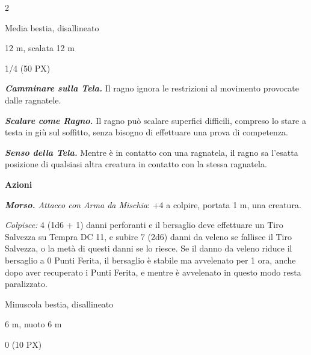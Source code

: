 \begin{multicols}{2}
{
\begin{description}[noitemsep, topsep=0pt, parsep=0pt, partopsep=0pt, itemsep=1pt, leftmargin=2.35cm,  labelwidth=2.2cm, itemindent=0cm, listparindent=0pt] %
\setlength{\baselineskip}{10pt}
\item[\textbf{Taglia/Tipo}] Media bestia, disallineato
\item[\textbf{Caratt.}] 
\item[\textbf{Punti Ferita}] 
\item[\textbf{Tiri Salvez.}] 
\item[\textbf{Movimento}] 12 m, scalata 12 m
\item[\textbf{Sfida}] 1/4 (50 PX)
\end{description}
\smallskip

\emph{\textbf{Camminare sulla Tela.}} Il ragno ignora le restrizioni al movimento provocate dalle ragnatele.

\emph{\textbf{Scalare come Ragno.}} Il ragno può scalare superfici difficili, compreso lo stare a testa in giù sul soffitto, senza bisogno di effettuare una prova di competenza.

\emph{\textbf{Senso della Tela.}} Mentre è in contatto con una ragnatela, il ragno sa l'esatta posizione di qualsiasi altra creatura in contatto con la stessa ragnatela.

\textbf{Azioni}

\emph{\textbf{Morso.} Attacco con Arma da Mischia}: +4 a colpire, portata 1 m, una creatura.

\emph{Colpisce:} 4 (1d6 + 1) danni perforanti e il bersaglio deve effettuare un Tiro Salvezza su Tempra DC 11, e subire 7 (2d6) danni da veleno se fallisce il Tiro Salvezza, o la metà di questi danni se lo riesce. Se il danno da veleno riduce il bersaglio a 0 Punti Ferita, il bersaglio è stabile ma avvelenato per 1 ora, anche dopo aver recuperato i Punti Ferita, e mentre è avvelenato in questo modo resta paralizzato.

\begin{description}[noitemsep, topsep=0pt, parsep=0pt, partopsep=0pt, itemsep=1pt, leftmargin=2.35cm,  labelwidth=2.2cm, itemindent=0cm, listparindent=0pt] %
\setlength{\baselineskip}{10pt}
\item[\textbf{Taglia/Tipo}] Minuscola bestia, disallineato
\item[\textbf{Caratt.}] 
\item[\textbf{Punti Ferita}] 
\item[\textbf{Tiri Salvez.}] 
\item[\textbf{Movimento}] 6 m, nuoto 6 m
\item[\textbf{Sfida}] 0 (10 PX)
\end{description}
\smallskip

}
\end{multicols}
